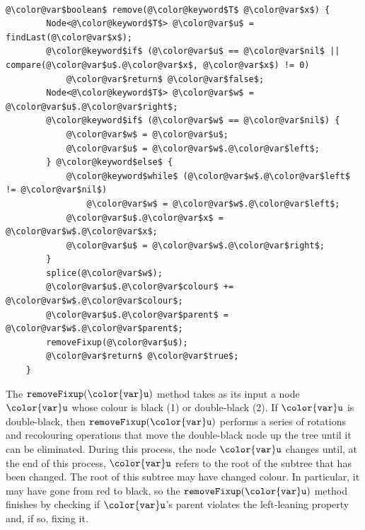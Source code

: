 \documentclass[10pt]{book}
\theoremstyle{plain}
\theoremstyle{definition}
\begin{document}
 \ \vspace{.5ex}\begin{Verbatim}[gobble=1,tabsize=2,frame=single,framerule=1.2pt,commandchars=\\@\$,label=\texttt{RedBlackTree},labelposition=topline]
	@\color@var$boolean$ remove(@\color@keyword$T$ @\color@var$x$) {
		Node<@\color@keyword$T$> @\color@var$u$ = findLast(@\color@var$x$);
		@\color@keyword$if$ (@\color@var$u$ == @\color@var$nil$ || compare(@\color@var$u$.@\color@var$x$, @\color@var$x$) != 0)
			@\color@var$return$ @\color@var$false$;
		Node<@\color@keyword$T$> @\color@var$w$ = @\color@var$u$.@\color@var$right$;
		@\color@keyword$if$ (@\color@var$w$ == @\color@var$nil$) {
			@\color@var$w$ = @\color@var$u$;
			@\color@var$u$ = @\color@var$w$.@\color@var$left$;
		} @\color@keyword$else$ {
			@\color@keyword$while$ (@\color@var$w$.@\color@var$left$ != @\color@var$nil$)
				@\color@var$w$ = @\color@var$w$.@\color@var$left$;
			@\color@var$u$.@\color@var$x$ = @\color@var$w$.@\color@var$x$;
			@\color@var$u$ = @\color@var$w$.@\color@var$right$;
		}
		splice(@\color@var$w$);
		@\color@var$u$.@\color@var$colour$ += @\color@var$w$.@\color@var$colour$;
		@\color@var$u$.@\color@var$parent$ = @\color@var$w$.@\color@var$parent$;
		removeFixup(@\color@var$u$);
		@\color@var$return$ @\color@var$true$;
	}
\end{Verbatim}


The \ensuremath{\mathtt{removeFixup({\color{var}u})}} method takes as its input a node \ensuremath{\mathtt{{\color{var}u}}} whose colour is black
(1) or double-black (2).  If \ensuremath{\mathtt{{\color{var}u}}} is double-black, then \ensuremath{\mathtt{removeFixup({\color{var}u})}}
performs a series of rotations and recolouring operations that move the
double-black node up the tree until it can be eliminated.  During this
process, the node \ensuremath{\mathtt{{\color{var}u}}} changes until, at the end of this process, \ensuremath{\mathtt{{\color{var}u}}}
refers to the root of the subtree that has been changed.  The root of
this subtree may have changed colour.  In particular, it may have gone
from red to black, so the \ensuremath{\mathtt{removeFixup({\color{var}u})}} method finishes by checking
if \ensuremath{\mathtt{{\color{var}u}}}'s parent violates the left-leaning property and, if so, fixing it.
\end{document}
